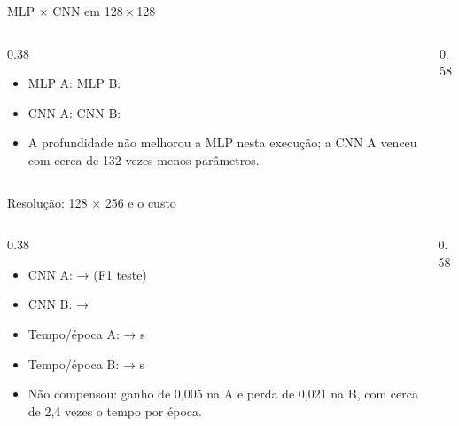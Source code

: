 \documentclass[aspectratio=169,10pt,t]{beamer}
\begin{document}
\begin{frame}{MLP × CNN em 128\,×\,128}
\begin{columns}[T]
\begin{column}{0.38\textwidth}
\begin{itemize}
\item MLP A:  \quad MLP B: 
\item CNN A:  \quad CNN B: 
\item A profundidade não melhorou a MLP nesta execução; a CNN A venceu com cerca de 132 vezes menos parâmetros.
\end{itemize}
\end{column}
\begin{column}{0.58\textwidth}
\centering{}
\end{column}
\end{columns}
\end{frame}

\begin{frame}{Resolução: 128 × 256 e o custo}
\begin{columns}[T]
\begin{column}{0.38\textwidth}
\begin{itemize}
\item CNN A:  →  (F1 teste)
\item CNN B:  → 
\item Tempo/época A:  →  s
\item Tempo/época B:  →  s
\item Não compensou: ganho de 0,005 na A e perda de 0,021 na B, com cerca de 2,4 vezes o tempo por época.
\end{itemize}
\end{column}
\begin{column}{0.58\textwidth}
\centering{}
\end{column}
\end{columns}
\end{frame}
\end{document}
